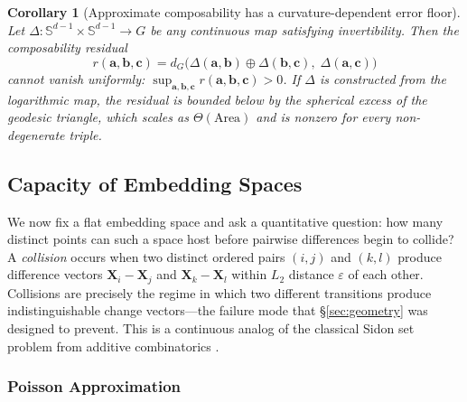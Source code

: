 \documentclass{article}
\newtheorem{corollary}{Corollary}
\newcommand{\vect}[1]{\mathbf{#1}}
\newcommand{\Sph}{\mathbb{S}}
\newcommand*{\secref}[1]{\hyperref[{#1}]{\S\ref*{#1}}}
\begin{document}
\begin{corollary}[Approximate composability has a curvature-dependent error floor]
\label{cor:approx_floor}
Let $\Delta : \Sph^{d-1} \times \Sph^{d-1} \to G$ be any continuous map
satisfying invertibility. Then the composability residual
\[
    r(\vect{a}, \vect{b}, \vect{c})
    = d_G\!\bigl(\Delta(\vect{a}, \vect{b}) \oplus \Delta(\vect{b}, \vect{c}),\;
                  \Delta(\vect{a}, \vect{c})\bigr)
\]
cannot vanish uniformly: $\sup_{\vect{a},\vect{b},\vect{c}} r(\vect{a},
\vect{b}, \vect{c}) > 0$. If $\Delta$ is constructed from the logarithmic
map, the residual is bounded below by the spherical excess of the geodesic
triangle, which scales as $\Theta(\mathrm{Area})$ and is nonzero for every
non-degenerate triple.
\end{corollary}

\subsection{Capacity of Embedding Spaces}
\label{sec:capacity}

We now fix a flat embedding space and ask a quantitative question: how many distinct points can such a space host before pairwise differences begin to collide? A \emph{collision} occurs when two distinct ordered pairs $(i,j)$ and $(k,l)$ produce difference vectors $\vect{X}_i - \vect{X}_j$ and $\vect{X}_k - \vect{X}_l$ within $L_2$ distance $\varepsilon$ of each other. Collisions are precisely the regime in which two different transitions produce indistinguishable change vectors---the failure mode that \secref{sec:geometry} was designed to prevent. This is a continuous analog of the classical Sidon set problem from additive combinatorics \citep{erdos1941problem, halberstam1983sequences}.

\subsubsection{Poisson Approximation}
\end{document}
